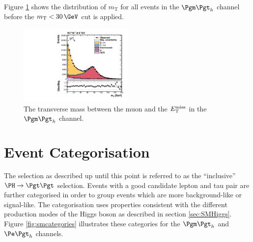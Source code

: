 Figure \ref{fig:transversemass} shows the distribution of $m_{\text{T}}$ for all
events in the $\mutau$ channel before the $m_{\text{T}}<30\,\GeV$ cut is
applied.

\begin{figure}[htb]
\begin{center}
    \includegraphics[width=0.5\textwidth]
      {plots/htt-sm/mt_1_inclusive_mt_2012.pdf}

\end{center}
\caption{
 The transverse mass between the muon and the $E_{\mathrm{T}}^{\text{miss}}$ in the $\mutau$ channel.  
}
\label{fig:transversemass}
\end{figure}


\section{Event Categorisation}
\label{sec:eventcategorisation}

The selection as described up until this point is referred to as the
``inclusive'' $\HToTauTau$ selection. 
Events with a good candidate lepton and tau pair are further categorised in
order to group events which are more background-like or signal-like. The
categorisation uses properties consistent with the different production modes of
the Higgs boson as described in section \ref{sec:SMHiggs}. Figure
\ref{fig:smcategories} illustrates these categories for the $\mutau$ and $\etau$
channels.

